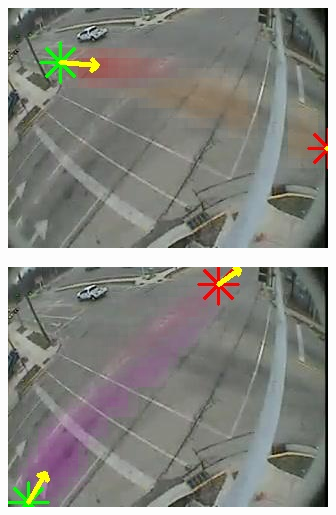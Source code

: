 \begin{figure}
    \centering
        \begin{subfigure}{0.32\linewidth}
            \includegraphics[width=\linewidth]{./img/scene_learning/res/intersection_4/intersection_4-0.jpg}
        \end{subfigure}
        \begin{subfigure}{0.32\linewidth}
            \includegraphics[width=\linewidth]{./img/scene_learning/res/intersection_4/intersection_4-1.jpg}
        \end{subfigure}
        \begin{subfigure}{0.32\linewidth}

\end{subfigure}
\end{figure}
